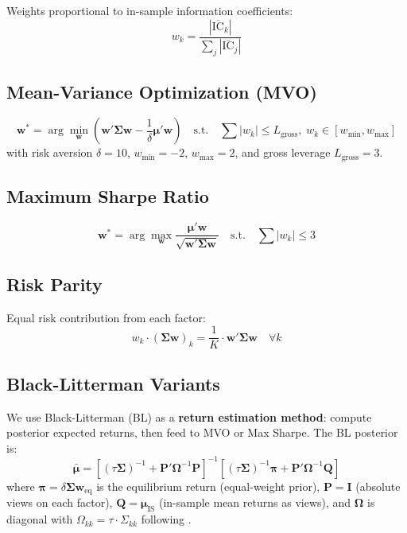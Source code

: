 \documentclass[12pt,a4paper]{article}
\begin{document}
Weights proportional to in-sample information coefficients:
\begin{equation}
    w_k = \frac{|\overline{\text{IC}}_k|}{\sum_{j} |\overline{\text{IC}}_j|}
\end{equation}

\subsection{Mean-Variance Optimization (MVO)}

\begin{equation}
    \mathbf{w}^* = \arg\min_{\mathbf{w}} \left( \mathbf{w}'\boldsymbol{\Sigma}\mathbf{w} - \frac{1}{\delta}\boldsymbol{\mu}'\mathbf{w} \right) \quad \text{s.t.} \quad \sum |w_k| \leq L_{\text{gross}}, \; w_k \in [w_{\min}, w_{\max}]
\end{equation}
with risk aversion $\delta = 10$, $w_{\min} = -2$, $w_{\max} = 2$, and gross leverage $L_{\text{gross}} = 3$.

\subsection{Maximum Sharpe Ratio}

\begin{equation}
    \mathbf{w}^* = \arg\max_{\mathbf{w}} \frac{\boldsymbol{\mu}'\mathbf{w}}{\sqrt{\mathbf{w}'\boldsymbol{\Sigma}\mathbf{w}}} \quad \text{s.t.} \quad \sum |w_k| \leq 3
\end{equation}

\subsection{Risk Parity}

Equal risk contribution from each factor:
\begin{equation}
    w_k \cdot (\boldsymbol{\Sigma}\mathbf{w})_k = \frac{1}{K} \cdot \mathbf{w}'\boldsymbol{\Sigma}\mathbf{w} \quad \forall k
\end{equation}

\subsection{Black-Litterman Variants}

We use Black-Litterman (BL) as a \textbf{return estimation method}: compute posterior expected returns, then feed to MVO or Max Sharpe. The BL posterior is:
\begin{equation}
    \bar{\boldsymbol{\mu}} = \left[(\tau\boldsymbol{\Sigma})^{-1} + \mathbf{P}'\boldsymbol{\Omega}^{-1}\mathbf{P}\right]^{-1} \left[(\tau\boldsymbol{\Sigma})^{-1}\boldsymbol{\pi} + \mathbf{P}'\boldsymbol{\Omega}^{-1}\mathbf{Q}\right]
\end{equation}
where $\boldsymbol{\pi} = \delta\boldsymbol{\Sigma}\mathbf{w}_{\text{eq}}$ is the equilibrium return (equal-weight prior), $\mathbf{P} = \mathbf{I}$ (absolute views on each factor), $\mathbf{Q} = \boldsymbol{\mu}_{\text{IS}}$ (in-sample mean returns as views), and $\boldsymbol{\Omega}$ is diagonal with $\Omega_{kk} = \tau \cdot \Sigma_{kk}$ following \citet{he1999intuition}.
\end{document}

